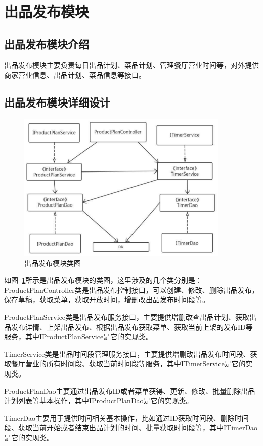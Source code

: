 \section{出品发布模块}
\subsection{出品发布模块介绍}
出品发布模块主要负责每日出品计划、菜品计划、管理餐厅营业时间等，对外提供商家营业信息、出品计划、菜品信息等接口。\\

\subsection{出品发布模块详细设计}
\begin{figure}[htbp!]
    \centering
    \includegraphics[width=4in]{FIGs/chapter4/dish.pdf}
    \caption{出品发布模块类图}\label{fig_dish}
\end{figure}

如图~\ref{fig_dish}所示是出品发布模块的类图，这里涉及的几个类分别是：ProductPlanController类是出品发布控制接口，可以创建、修改、删除出品发布，保存草稿，获取菜单，获取开放时间，增删改出品发布时间段等。

ProductPlanService类是出品发布服务接口，主要提供增删改查出品计划、获取出品发布详情、上架出品发布、根据出品发布获取菜单、获取当前上架的发布ID等服务，其中IProductPlanService是它的实现类。

TimerService类是出品时间段管理服务接口，主要提供增删改出品发布时间段、获取餐厅营业的所有时间段、获取当前时间段等服务，其中ITimerService是它的实现类。

ProductPlanDao主要通过出品发布ID或者菜单获得、更新、修改、批量删除出品计划列表等基本操作，其中IProductPlanDao是它的实现类。

TimerDao主要用于提供时间相关基本操作，比如通过ID获取时间段、删除时间段、获取当前开始或者结束出品计划的时间、批量获取时间段等，其中ITimerDao是它的实现类。\\

